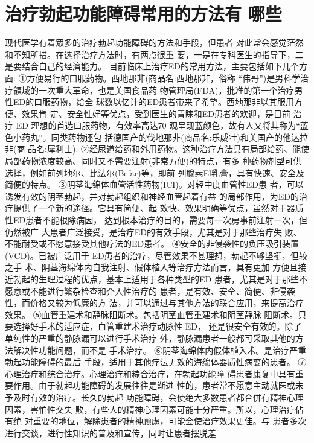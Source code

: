 \documentclass[12pt,UTF8]{ctexbook}
\begin{document}
\section{治疗勃起功能障碍常用的方法有
哪些}
现代医学有着眾多的治疗勃起功能障碍的方法和手段，但患者
对此常会感觉茫然和不知所措。在选择治疗方法时，有两点很重
要，一是在专科医生的指导下，二是要结合自己的经濟能力。
目前临床上治疗ED的常用方法，主要包括如下几个方面:
①方便易行的口服药物。西地那非(商品名:西地那非，俗称
“伟哥”)是男科学治疗領域的一次重大革命，也是美国食品药
物管理局(FDA)，批准的第一个治疗男性ED的口服药物，给全
球数以亿计的ED患者带来了希望。西地那非以其服用方便、效果肯
定、安全性好等优点，受到医生的青睐和ED患者的欢迎，是目前
治疗 ED 理想的首选口服药物，有效率高达70%
观呈现蓝颜色，故有人又将其称为“蓝色小药丸”。同类药物还包
括德国产的伐地那非(商品名:乐威壮)和美国产的他达拉非(商
品名:犀利士).
②经尿道给药和外用药物。这种治疗方法具有局部给药、能使
局部药物浓度较高、同时又不需要注射(非常方便)的特点，有多
种药物剂型可供选择，例如前列地尔、比法尔(Befar)等，即前
列腺素El乳膏，具有快速、安全及简便的特点。
③阴茎海绵体血管活性药物(ICI)。对轻中度血管性ED患
者，可以诱发有效的阴茎勃起，并对勃起组织和神经血管起着有益
的局部作用，为ED的治疗提供了一个新的途径。它具有简便、起
效快、效果明确等优点，虽然对于器质性ED患者不能根除病因，
达到根本治疗的目的，需要每一次房事前注射一次，但仍然被广
大患者广泛接受，是治疗ED的有效手段，尤其是对于那些治疗失
败、不能耐受或不愿意接受其他疗法的ED患者。
④安全的非侵袭性的负压吸引装置(VCD)。已被广泛用于
ED患者的治疗，尽管效果不甚理想，勃起不够坚挺，但较之手
术、阴茎海绵体内自我注射、假体植入等治疗方法而言，具有更加
方便且接近勃起的生理过程的优点，基本上适用于各种类型的ED
患者，尤其是对于那些不愿意或不能进行繁杂检查和介入性治疗的
患者，是有效、安全、简便、非侵袭性，而价格又较为低廉的方
法，并可以通过与其他方法的联合应用，来提高治疗效果。
⑤血管重建术和静脉阻断术。包括阴茎血管重建术和阴茎静脉
阻断术。只要选择好手术的适应症，血管重建术治疗动脉性 ED，
还是很安全有效的。除了单纯性的严重的静脉漏可以进行手术治疗
外，静脉漏患者一般都可采取其他的方法解决性功能问题，而不是
手术治疗。
⑥阴茎海绵体内假体植入术。是治疗严重勃起功能障碍的最后
手段，适用于其他疗法无效的海绵体器质性病变的患者。
⑦心理治疗和综合治疗。心理治疗和粽合治疗，在勃起功能障
碍患者康复中具有重要作用。由于勃起功能障碍的发展往往是渐进
性的，患者常不愿意主动就医或未予及时有效的治疗。长久的勃起
功能障碍，会使绝大多数患者都合併有精神心理因素，害怕性交失
败，有些人的精神心理因素可能十分严重。所以，心理治疗佔有绝
对重要的地位，解除患者的精神顾虑，可能会使治疗效果更佳。与
患者多次进行交谈，进行性知识的普及和宣传，同时让患者摆脱羞
\end{document}
